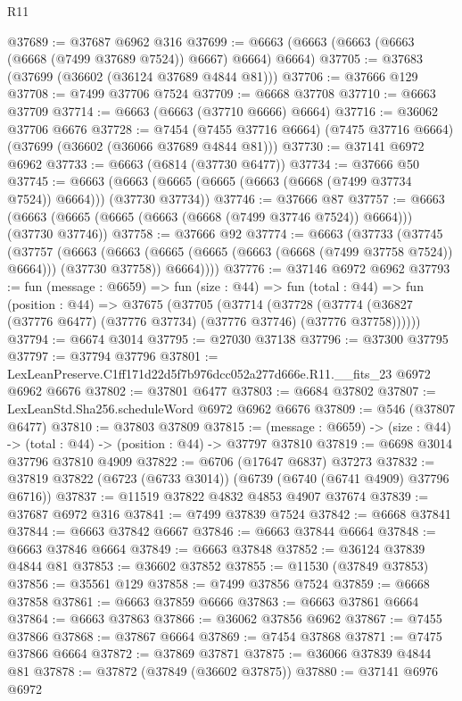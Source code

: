 \begin{lexlean}{R11}
\begin{coremodule}
@37689 := @37687 @6962 @316
@37699 := @6663 (@6663 (@6663 (@6663 (@6668 (@7499 @37689 @7524)) @6667) @6664) @6664)
@37705 := @37683 (@37699 (@36602 (@36124 @37689 @4844 @81)))
@37706 := @37666 @129
@37708 := @7499 @37706 @7524
@37709 := @6668 @37708
@37710 := @6663 @37709
@37714 := @6663 (@6663 (@37710 @6666) @6664)
@37716 := @36062 @37706 @6676
@37728 := @7454
    (@7455 @37716 @6664)
    (@7475 @37716 @6664)
    (@37699 (@36602 (@36066 @37689 @4844 @81)))
@37730 := @37141 @6972 @6962
@37733 := @6663 (@6814 (@37730 @6477))
@37734 := @37666 @50
@37745 := @6663 (@6663 (@6665 (@6665 (@6663 (@6668 (@7499 @37734 @7524)) @6664))) (@37730 @37734))
@37746 := @37666 @87
@37757 := @6663 (@6663 (@6665 (@6665 (@6663 (@6668 (@7499 @37746 @7524)) @6664))) (@37730 @37746))
@37758 := @37666 @92
@37774 := @6663
    (@37733
      (@37745
        (@37757
          (@6663
            (@6663 (@6665 (@6665 (@6663 (@6668 (@7499 @37758 @7524)) @6664))) (@37730 @37758))
            @6664))))
@37776 := @37146 @6972 @6962
@37793 := fun (message : @6659) =>
  fun (size : @44) =>
  fun (total : @44) =>
  fun (position : @44) =>
  @37675
    (@37705
      (@37714
        (@37728 (@37774 (@36827 (@37776 @6477) (@37776 @37734) (@37776 @37746) (@37776 @37758))))))
@37794 := @6674 @3014
@37795 := @27030 @37138
@37796 := @37300 @37795
@37797 := @37794 @37796
@37801 := LexLeanPreserve.C1ff171d22d5f7b976dcc052a277d666e.R11.__fits_23 @6972 @6962 @6676
@37802 := @37801 @6477
@37803 := @6684 @37802
@37807 := LexLeanStd.Sha256.scheduleWord @6972 @6962 @6676
@37809 := @546 (@37807 @6477)
@37810 := @37803 @37809
@37815 := (message : @6659) -> (size : @44) -> (total : @44) -> (position : @44) -> @37797 @37810
@37819 := @6698 @3014 @37796 @37810 @4909
@37822 := @6706 (@17647 @6837) @37273
@37832 := @37819 @37822 (@6723 (@6733 @3014)) (@6739 (@6740 (@6741 @4909) @37796 @6716))
@37837 := @11519 @37822 @4832 @4853 @4907 @37674
@37839 := @37687 @6972 @316
@37841 := @7499 @37839 @7524
@37842 := @6668 @37841
@37844 := @6663 @37842 @6667
@37846 := @6663 @37844 @6664
@37848 := @6663 @37846 @6664
@37849 := @6663 @37848
@37852 := @36124 @37839 @4844 @81
@37853 := @36602 @37852
@37855 := @11530 (@37849 @37853)
@37856 := @35561 @129
@37858 := @7499 @37856 @7524
@37859 := @6668 @37858
@37861 := @6663 @37859 @6666
@37863 := @6663 @37861 @6664
@37864 := @6663 @37863
@37866 := @36062 @37856 @6962
@37867 := @7455 @37866
@37868 := @37867 @6664
@37869 := @7454 @37868
@37871 := @7475 @37866 @6664
@37872 := @37869 @37871
@37875 := @36066 @37839 @4844 @81
@37878 := @37872 (@37849 (@36602 @37875))
@37880 := @37141 @6976 @6972

\end{coremodule}
\end{lexlean}
